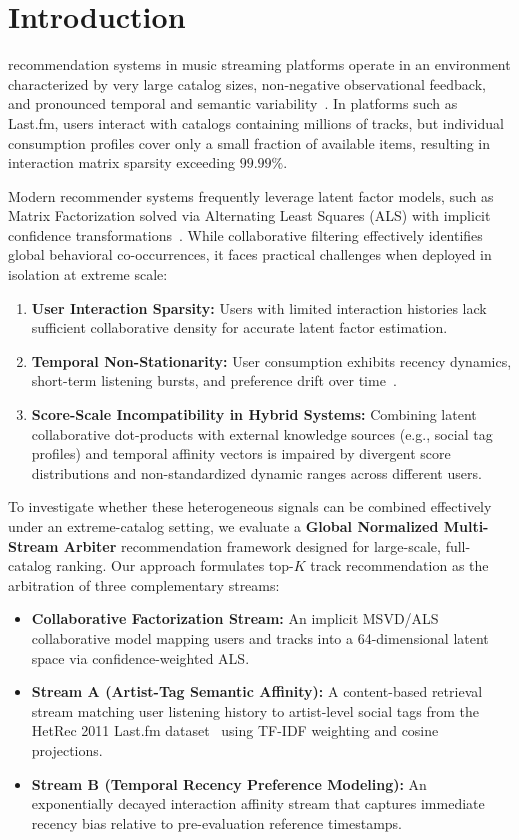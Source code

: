 \documentclass[conference]{IEEEtran}
\begin{document}
\section{Introduction}
 recommendation systems in music streaming platforms operate in an environment characterized by very large catalog sizes, non-negative observational feedback, and pronounced temporal and semantic variability~\cite{hu2008collaborative,celma2008music}. In platforms such as Last.fm, users interact with catalogs containing millions of tracks, but individual consumption profiles cover only a small fraction of available items, resulting in interaction matrix sparsity exceeding $99.99\%$.

Modern recommender systems frequently leverage latent factor models, such as Matrix Factorization solved via Alternating Least Squares (ALS) with implicit confidence transformations~\cite{hu2008collaborative,koren2009matrix}. While collaborative filtering effectively identifies global behavioral co-occurrences, it faces practical challenges when deployed in isolation at extreme scale:
\begin{enumerate}
    \item \textbf{User Interaction Sparsity:} Users with limited interaction histories lack sufficient collaborative density for accurate latent factor estimation.
    \item \textbf{Temporal Non-Stationarity:} User consumption exhibits recency dynamics, short-term listening bursts, and preference drift over time~\cite{koren2010collaborative}.
    \item \textbf{Score-Scale Incompatibility in Hybrid Systems:} Combining latent collaborative dot-products with external knowledge sources (e.g., social tag profiles) and temporal affinity vectors is impaired by divergent score distributions and non-standardized dynamic ranges across different users.
\end{enumerate}

To investigate whether these heterogeneous signals can be combined effectively under an extreme-catalog setting, we evaluate a \textbf{Global Normalized Multi-Stream Arbiter} recommendation framework designed for large-scale, full-catalog ranking. Our approach formulates top-$K$ track recommendation as the arbitration of three complementary streams:
\begin{itemize}
    \item \textbf{Collaborative Factorization Stream:} An implicit MSVD/ALS collaborative model mapping users and tracks into a 64-dimensional latent space via confidence-weighted ALS.
    \item \textbf{Stream A (Artist-Tag Semantic Affinity):} A content-based retrieval stream matching user listening history to artist-level social tags from the HetRec 2011 Last.fm dataset~\cite{cantador2011hetrec} using TF-IDF weighting and cosine projections.
    \item \textbf{Stream B (Temporal Recency Preference Modeling):} An exponentially decayed interaction affinity stream that captures immediate recency bias relative to pre-evaluation reference timestamps.
\end{itemize}
\end{document}

